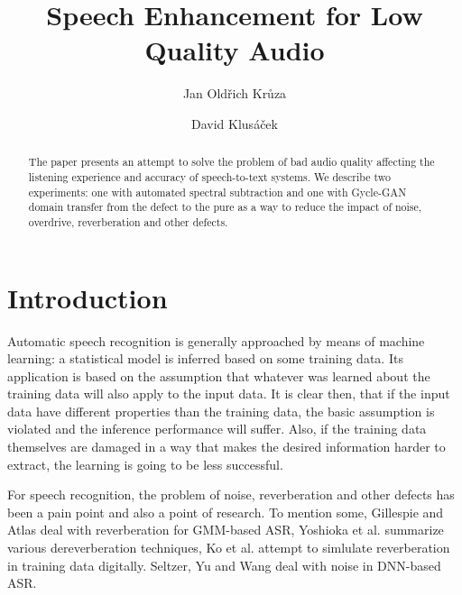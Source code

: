 \documentclass[runningheads]{llncs}
\begin{document}
%
\title{Speech Enhancement for Low Quality Audio}
%
%
\author{Jan Oldřich Krůza\\
\and David Klusáček}
%
%
%
\maketitle              %
%
\begin{abstract}
The paper presents an attempt to solve the problem of bad audio quality
affecting the listening experience and accuracy of speech-to-text systems. We
describe two experiments: one with automated spectral subtraction and one
with Gycle-GAN domain transfer from the defect to the
pure as a way to reduce the impact of noise, overdrive, reverberation and other
defects.
\end{abstract}

\section{Introduction}

Automatic speech recognition is generally approached by means of machine
learning: a statistical model is inferred based on some training data. Its
application is based on the assumption that whatever was learned about the training
data will also apply to the input data. It is clear then, that if the input
data have different properties than the training data, the basic assumption is
violated and the inference performance will suffer.
Also, if the training data themselves are damaged in a way that makes the desired
information harder to extract, the learning is going to be less successful.

For speech recognition, the problem of noise, reverberation and other defects
has been a pain point and also a point of research. To mention some, Gillespie
and Atlas\cite{gillespie2002diversity} deal with reverberation for
GMM-based ASR, Yoshioka et al.\cite{reverbmagazine} summarize various
dereverberation techniques, Ko et al.\cite{reverbaugment} attempt to
simlulate reverberation in training data digitally. Seltzer, Yu and
Wang\cite{dnnnoiserobust} deal with noise in DNN-based ASR.
\end{document}
